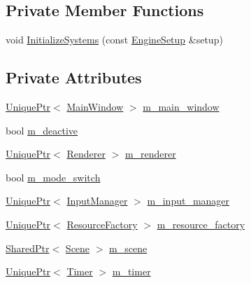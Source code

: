 \subsection*{Private Member Functions}
\begin{DoxyCompactItemize}
\item 
void \hyperlink{classmage_1_1_engine_a29a47448fb182b110d46d287a72b8b4e}{Initialize\+Systems} (const \hyperlink{structmage_1_1_engine_setup}{Engine\+Setup} \&setup)
\end{DoxyCompactItemize}
\subsection*{Private Attributes}
\begin{DoxyCompactItemize}
\item 
\hyperlink{namespacemage_a8c307fbcc33bce9b7f2aa4c26c3b95cf}{Unique\+Ptr}$<$ \hyperlink{classmage_1_1_main_window}{Main\+Window} $>$ \hyperlink{classmage_1_1_engine_a3aea7e8c0c1247cac570334a3d3543d6}{m\+\_\+main\+\_\+window}
\item 
bool \hyperlink{classmage_1_1_engine_ab8a4b0157403708ae7d1d018a95b4c63}{m\+\_\+deactive}
\item 
\hyperlink{namespacemage_a8c307fbcc33bce9b7f2aa4c26c3b95cf}{Unique\+Ptr}$<$ \hyperlink{classmage_1_1_renderer}{Renderer} $>$ \hyperlink{classmage_1_1_engine_a1248b7c21bc8256c72d372c12ed1ee68}{m\+\_\+renderer}
\item 
bool \hyperlink{classmage_1_1_engine_aa5cb2e0b7bb2c4a9020e79ab832ee221}{m\+\_\+mode\+\_\+switch}
\item 
\hyperlink{namespacemage_a8c307fbcc33bce9b7f2aa4c26c3b95cf}{Unique\+Ptr}$<$ \hyperlink{classmage_1_1_input_manager}{Input\+Manager} $>$ \hyperlink{classmage_1_1_engine_a8e9048208a6a5c5b034aaa1cbdab28bc}{m\+\_\+input\+\_\+manager}
\item 
\hyperlink{namespacemage_a8c307fbcc33bce9b7f2aa4c26c3b95cf}{Unique\+Ptr}$<$ \hyperlink{classmage_1_1_resource_factory}{Resource\+Factory} $>$ \hyperlink{classmage_1_1_engine_a0c7c2d4fc75fc3512e02054056cf8a90}{m\+\_\+resource\+\_\+factory}
\item 
\hyperlink{namespacemage_a1e01ae66713838a7a67d30e44c67703e}{Shared\+Ptr}$<$ \hyperlink{classmage_1_1_scene}{Scene} $>$ \hyperlink{classmage_1_1_engine_a82158ab9c1b60538ef8c46d5eb263bb8}{m\+\_\+scene}
\item 
\hyperlink{namespacemage_a8c307fbcc33bce9b7f2aa4c26c3b95cf}{Unique\+Ptr}$<$ \hyperlink{classmage_1_1_timer}{Timer} $>$ \hyperlink{classmage_1_1_engine_a4daac998928a6c087b310c52b3f26ae4}{m\+\_\+timer}
\end{DoxyCompactItemize}
